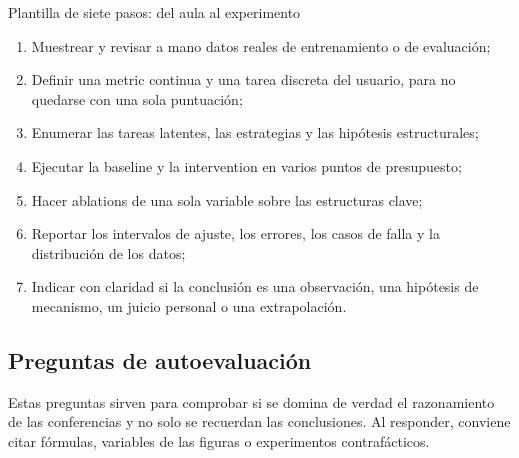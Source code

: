 \begin{importantbox}{Plantilla de siete pasos: del aula al experimento}
\begin{enumerate}
  \item Muestrear y revisar a mano datos reales de entrenamiento o de evaluación;
  \item Definir una metric continua y una tarea discreta del usuario, para no quedarse con una sola puntuación;
  \item Enumerar las tareas latentes, las estrategias y las hipótesis estructurales;
  \item Ejecutar la baseline y la intervention en varios puntos de presupuesto;
  \item Hacer ablations de una sola variable sobre las estructuras clave;
  \item Reportar los intervalos de ajuste, los errores, los casos de falla y la distribución de los datos;
  \item Indicar con claridad si la conclusión es una observación, una hipótesis de mecanismo, un juicio personal o una extrapolación.
\end{enumerate}
\end{importantbox}

\subsection{Preguntas de autoevaluación}

Estas preguntas sirven para comprobar si se domina de verdad el razonamiento de las conferencias y no solo se recuerdan las conclusiones. Al responder, conviene citar fórmulas, variables de las figuras o experimentos contrafácticos.

